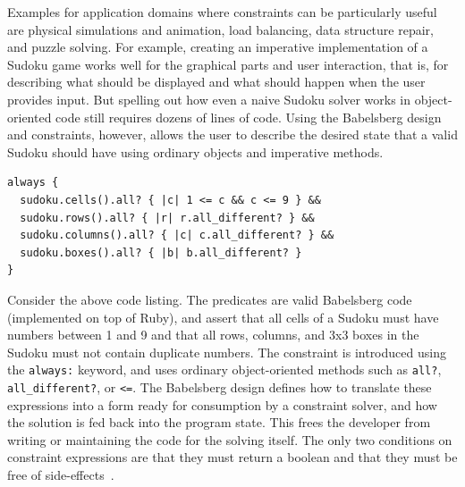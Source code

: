 \documentclass[numbers]{sigplanconf}
\begin{document}
Examples for application domains where constraints can be particularly useful
are physical simulations and animation, load balancing, data structure repair,
and puzzle solving. For example, creating an imperative implementation of a
Sudoku game works well for the graphical parts and user interaction, that is,
for describing what should be displayed and what should happen when the user
provides input. But spelling out how even a naive Sudoku solver works in
object-oriented code still requires dozens of lines of code. Using the
Babelsberg design and constraints, however, allows the user to describe the
desired state that a valid Sudoku should have using ordinary objects and
imperative methods.

\begin{lstlisting}[label=lst:sudoku]
always {
  sudoku.cells().all? { |c| 1 <= c && c <= 9 } &&
  sudoku.rows().all? { |r| r.all_different? } &&
  sudoku.columns().all? { |c| c.all_different? } &&
  sudoku.boxes().all? { |b| b.all_different? }
}
\end{lstlisting}

Consider the above code listing. The predicates are valid Babelsberg code
(implemented on top of Ruby), and assert that all cells of a Sudoku must have
numbers between 1 and 9 and that all rows, columns, and 3x3 boxes in the Sudoku
must not contain duplicate numbers. The constraint is introduced using the
\verb!always:!  keyword, and uses ordinary object-oriented methods such as
\verb!all?!, \verb!all_different?!, or \verb!<=!. The Babelsberg design defines
how to translate these expressions into a form ready for consumption by a
constraint solver, and how the solution is fed back into the program state. This
frees the developer from writing or maintaining the code for the solving
itself. The only two conditions on constraint expressions are that they must
return a boolean and that they must be free of
side-effects~\cite{FelgentreffOOPSLA2015}.
\end{document}
